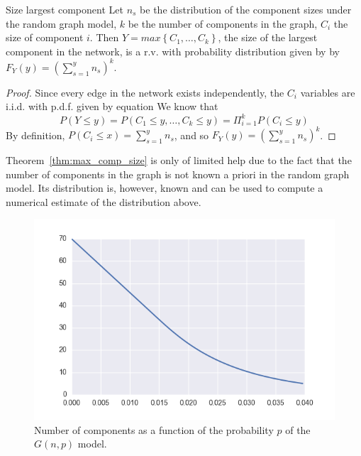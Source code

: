 \begin{theorem}{Size largest component}
\label{thm:max_comp_size}
Let $n_s$ be the distribution of the component sizes under the random graph model, $k$ be the number of components in the graph, $C_i$ the size of component $i$.
Then $Y=max\left\{ C_1,\ldots,C_k\right\}$, the size of the largest component in the network, is a r.v. with probability distribution given by
by $F_Y(y) = (\sum_{s=1}^{y} n_s)^k$.
\end{theorem}
\begin{proof}
Since every edge in the network exists independently, the $C_i$ variables are i.i.d. with p.d.f. given by equation
We know that 
$$P(Y\le y) = P (C_1 \le y, \ldots , C_k \le y) = \Pi_{i=1}^{k} P(C_i \le y)$$
By definition, $P(C_i \le x) = \sum_{s=1}^y n_s$, and so $F_Y(y) = \left( \sum_{s=1}^y n_s \right)^k$.
\end{proof}
\vspace{0.3cm}
\begin{remark}
Theorem~\vref{thm:max_comp_size} is only of limited help due to the fact that the number of components in the graph is not known a priori in the random graph model.
Its distribution is, however, known and can be used to compute a numerical estimate of the distribution above.
\end{remark}

\begin{figure}[tb]
	\centering
	\includegraphics[scale=0.8]{figures/gnp_number_components.png}
	\caption{Number of components as a function of the probability $p$ of the $G(n,p)$ model.}
	\label{fig:gnp_number_components}
\end{figure}










